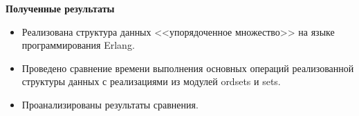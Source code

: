\documentclass{beamer}
\begin{document}
	\begin{frame}{\LARGE \textbf{Полученные результаты}}
		\begin{itemize}
			\item Реализована структура данных <<упорядоченное множество>> на языке программирования Erlang.
			\item Проведено сравнение времени выполнения основных операций реализованной структуры данных с 
			      реализациями из модулей ordsets и sets. 
			\item Проанализированы результаты сравнения.
		\end{itemize}
	\end{frame}
\end{document}
